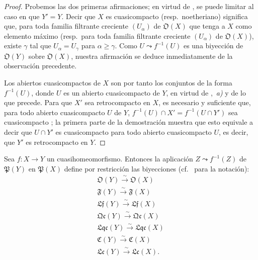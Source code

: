 \begin{proof}
Probemos las dos primeras afirmaciones; en virtud de , se puede limitar al caso en que $Y'=Y$.
Decir que $X$ es cuasicompacto (resp.\ noetheriano) significa que, para toda familia filtrante creciente $(U_\alpha)$ de $\mathfrak O(X)$ que tenga a $X$ como elemento máximo (resp.\ para toda familia filtrante creciente $(U_\alpha)$ de $\mathfrak O(X)$), existe $\gamma$ tal que $U_\alpha=U_\gamma$ para $\alpha\geq\gamma$.
Como $U\leadsto f^{-1}(U)$ es una biyección de $\mathfrak O(Y)$ sobre $\mathfrak O(X)$, nuestra afirmación se deduce inmediatamente de la observación precedente.

Los abiertos cuasicompactos de $X$ son por tanto los conjuntos de la forma $f^{-1}(U)$, donde $U$ es un abierto cuasicompacto de $Y$, en virtud de ,~\emph{a)} y de lo que precede.
Para que $X'$ sea retrocompacto en $X$, es necesario y suficiente que, para todo abierto cuasicompacto $U$ de $Y$, $f^{-1}(U)\cap X'=f^{-1}(U\cap Y')$ sea cuasicompacto ; la primera parte de la demostración muestra que esto equivale a decir que $U\cap Y'$ es cuasicompacto para todo abierto cuasicompacto $U$, es decir, que $Y'$ es retrocompacto en $Y$.
\end{proof}

\begin{proposition}[10.2.7]
\label{IV.10.2.7}
Sea $f:X\to Y$ un cuasihomeomorfismo.
Entonces la aplicación $Z\leadsto f^{-1}(Z)$ de $\mathfrak P(Y)$ en $\mathfrak P(X)$ define por restricción las biyecciones \textup{(cf.\  para la notación)}:
\[
\begin{gathered}
\mathfrak O(Y)\xrightarrow{\sim}\mathfrak O(X)\\
\mathfrak F(Y)\xrightarrow{\sim}\mathfrak F(X)\\
\mathfrak{Lf}(Y)\xrightarrow{\sim}\mathfrak{Lf}(X)\\
\mathfrak{Qc}(Y)\xrightarrow{\sim}\mathfrak{Qc}(X)\\
\mathfrak{Lqc}(Y)\xrightarrow{\sim}\mathfrak{Lqc}(X)\\
\mathfrak C(Y)\xrightarrow{\sim}\mathfrak C(X)\\
\mathfrak{Lc}(Y)\xrightarrow{\sim}\mathfrak{Lc}(X).
\end{gathered}
\]
\end{proposition}

